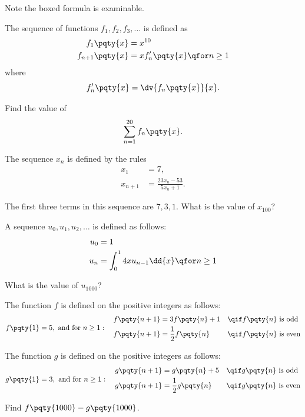 \documentclass{article}
\begin{document}
Note the boxed formula is examinable.

\begin{example}[TMUA 2016 P2 Q6]
    The sequence of functions \(f_1, f_2, f_3, \ldots\) is defined as
    \begin{align*}
        f_1 \pqty{x} &= x^{10} \\
        f_{n + 1} \pqty{x} &= x f_n'\pqty{x} \qfor n \geq 1
    \end{align*}
    where
    \[
        f'_n \pqty{x} = \dv{f_n\pqty{x}}{x}.
    \]

    Find the value of
    \[
        \sum_{n = 1}^{20} f_n \pqty{x}.
    \]
\end{example}

\begin{example}[TMUA 2017 P1 Q11]
    The sequence \(x_n\) is defined by the rules
    \begin{align*}
        x_1 &= 7, \\
        x_{n + 1} &= \frac{23 x_n - 53}{5 x_n + 1}.
    \end{align*}

    The first three terms in this sequence are \(7, 3, 1\). What is the value of \(x_{100}\)?
\end{example}

\begin{example}[TMUA 2017 P2 Q6]
    A sequence \(u_0, u_1, u_2, \ldots\) is defined as follows:
    \begin{align*}
        u_0 &= 1 \\
        u_n &= \int_{0}^{1} 4x u_{n - 1} \dd{x} \qfor n \geq 1
    \end{align*}

    What is the value of \(u_{1000}\)?
\end{example}

\begin{example}[TMUA 2017 P2 Q15]
    The function \(f\) is defined on the positive integers as follows:
    \[
        f\pqty{1} = 5, \text{ and for } n \geq 1: \quad
        \begin{aligned}
            f\pqty{n + 1} &= 3 f\pqty{n} + 1 && \qif f\pqty{n} \text{ is odd} \\
            f\pqty{n + 1} &= \frac{1}{2} f\pqty{n} && \qif f\pqty{n} \text{ is even}
        \end{aligned}
    \]


    The function \(g\) is defined on the positive integers as follows:
    \[
        g\pqty{1} = 3, \text{ and for } n \geq 1: \quad
        \begin{aligned}
            g\pqty{n + 1} &= g\pqty{n} + 5 && \qif g\pqty{n} \text{ is odd} \\
            g\pqty{n + 1} &= \frac{1}{2} g\pqty{n} && \qif g\pqty{n} \text{ is even}
        \end{aligned}
    \]

    Find \(f\pqty{1000} - g\pqty{1000}\).
\end{example}
\end{document}
